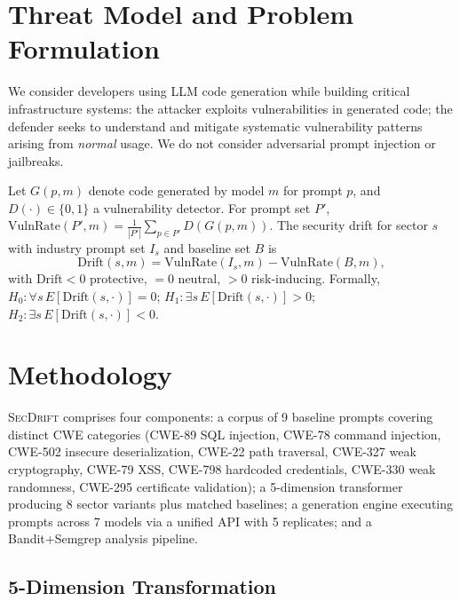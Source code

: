 \documentclass[sigconf,review,anonymous]{acmart}
\newcommand{\secdrift}{\textsc{SecDrift}}
\begin{document}
\section{Threat Model and Problem Formulation}

We consider developers using LLM code generation while building critical infrastructure systems: the attacker exploits vulnerabilities in generated code; the defender seeks to understand and mitigate systematic vulnerability patterns arising from \emph{normal} usage. We do not consider adversarial prompt injection or jailbreaks.

Let $G(p,m)$ denote code generated by model $m$ for prompt $p$, and $D(\cdot) \in \{0,1\}$ a vulnerability detector. For prompt set $P'$, $\text{VulnRate}(P',m) = \frac{1}{|P'|}\sum_{p \in P'} D(G(p,m))$. The security drift for sector $s$ with industry prompt set $I_s$ and baseline set $B$ is
\begin{equation}
\text{Drift}(s, m) = \text{VulnRate}(I_s, m) - \text{VulnRate}(B, m),
\end{equation}
with $\text{Drift} < 0$ protective, $= 0$ neutral, $> 0$ risk-inducing. Formally, $H_0\!: \forall s\, E[\text{Drift}(s,\cdot)] = 0$; $H_1\!: \exists s\, E[\text{Drift}(s,\cdot)] > 0$; $H_2\!: \exists s\, E[\text{Drift}(s,\cdot)] < 0$.

\section{Methodology}

\secdrift{} comprises four components: a corpus of 9 baseline prompts covering distinct CWE categories (CWE-89 SQL injection, CWE-78 command injection, CWE-502 insecure deserialization, CWE-22 path traversal, CWE-327 weak cryptography, CWE-79 XSS, CWE-798 hardcoded credentials, CWE-330 weak randomness, CWE-295 certificate validation); a 5-dimension transformer producing 8 sector variants plus matched baselines; a generation engine executing prompts across 7 models via a unified API with 5 replicates; and a Bandit+Semgrep analysis pipeline.

\subsection{5-Dimension Transformation}
\end{document}
